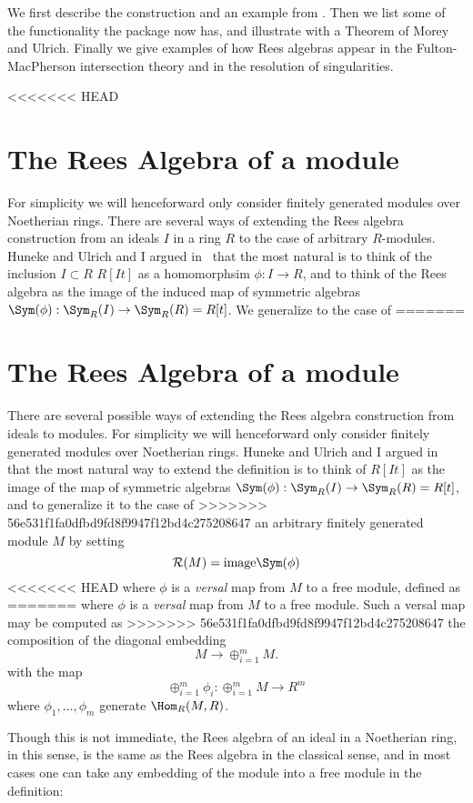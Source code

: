 \documentclass[twoside,12pt, leqno]{amsart}
\def\image{{\rm image}}
\def\RR{{\mathcal R}}
\begin{document}
We first describe the construction and an example from \cite{EHU}. Then we list some of the functionality the package now has, and illustrate with a Theorem of Morey and Ulrich. Finally we give examples of how Rees algebras
appear in the Fulton-MacPherson intersection theory and in the resolution of singularities.

<<<<<<< HEAD
\section{The Rees Algebra of a module} For simplicity we will henceforward only consider finitely generated modules
over Noetherian rings. There are several  ways of extending the Rees algebra construction from 
an ideals $I$ in a ring $R$ to the case of arbitrary $R$-modules. Huneke and Ulrich and I argued in~\cite{EHU} that the most natural is
to think of the inclusion $I\subset R$ $R[It]$ as a homomorphsim $\phi: I\to R$, and to think of
the Rees algebra as the image of the induced map of symmetric algebras
$\Sym(\phi): \Sym_R(I) \to \Sym_R(R) = R[t]$. We generalize to the case of
=======
\section{The Rees Algebra of a module} There are several possible ways of extending the Rees algebra construction from ideals to modules. For simplicity we will henceforward only consider finitely generated modules
over Noetherian rings. Huneke and Ulrich and I argued in~\cite{EHU} that the most natural
way to extend the definition is
to think of $R[It]$ as the image of the map of symmetric algebras
$\Sym(\phi): \Sym_R(I) \to \Sym_R(R) = R[t]$, and to generalize it to the case of
>>>>>>> 56e531f1fa0dfbd9fd8f9947f12bd4c275208647
an arbitrary finitely generated module $M$ by setting
$$
\RR(M) = \image \Sym(\phi)
$$ 
<<<<<<< HEAD
where $\phi$ is a \emph{versal} map from $M$ to a free module, defined as 
=======
where $\phi$ is a \emph{versal} map from $M$ to a free module. Such a
versal map may be computed as 
>>>>>>> 56e531f1fa0dfbd9fd8f9947f12bd4c275208647
the composition of 
the diagonal 
embedding 
$$
M \to \oplus_{i=1}^mM.
$$
with the map
$$
\oplus_{i=1}^m\phi_i: \oplus_{i=1}^mM \to R^{m}
$$ 
where
$\phi_1,\dots, \phi_m$ generate $\Hom_R(M,R)$.
 

Though this is not immediate, the Rees algebra of an ideal in a Noetherian ring, in this sense,
 is the same as the Rees algebra in the classical sense, and in most cases one can take
 any embedding of the module into a free module in the definition:
 
\end{document}
